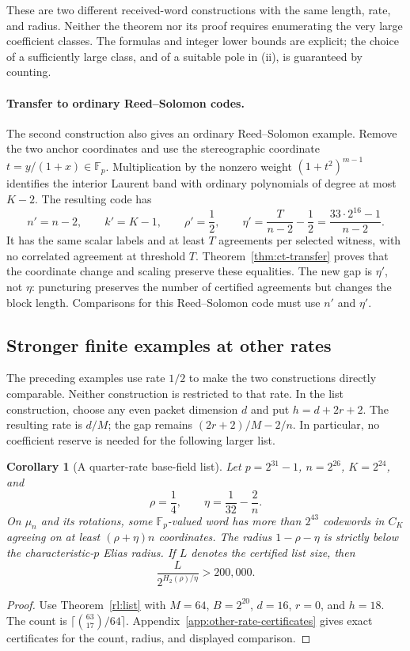 \documentclass[11pt,letterpaper]{article}
\newtheorem{corollary}[theorem]{Corollary}
\theoremstyle{definition}
\theoremstyle{remark}
\newcommand{\F}{\mathbb F}
\begin{document}
These are two different received-word constructions with the same
length, rate, and radius. Neither the theorem nor its proof requires
enumerating the very large coefficient classes. The formulas and
integer lower bounds are explicit; the choice of a sufficiently large
class, and of a suitable pole in (ii), is guaranteed by counting.

\paragraph{Transfer to ordinary Reed--Solomon codes.}
The second construction also gives an ordinary Reed--Solomon example.
Remove the two anchor coordinates and use the stereographic coordinate
$t=y/(1+x)\in\F_p$. Multiplication by the nonzero weight
$(1+t^2)^{m-1}$ identifies the interior Laurent band with ordinary
polynomials of degree at most $K-2$. The resulting code has
\[
 n'=n-2,\qquad k'=K-1,\qquad \rho'=\frac12,\qquad
 \eta'=\frac{T}{n-2}-\frac12
         =\frac{33\cdot2^{16}-1}{n-2}.
\]
It has the same scalar labels and at least $T$ agreements per
selected witness, with no correlated agreement at threshold $T$.
Theorem~\ref{thm:ct-transfer} proves that the coordinate change and
scaling preserve these equalities. The new gap is $\eta'$, not $\eta$:
puncturing preserves the number of certified agreements but changes
the block length. Comparisons for this Reed--Solomon code must use
$n'$ and $\eta'$.

\subsection{Stronger finite examples at other rates}

The preceding examples use rate $1/2$ to make the two constructions
directly comparable. Neither construction is restricted to that rate.
In the list construction, choose any even packet dimension $d$ and put
$h=d+2r+2$. The resulting rate is $d/M$; the gap remains
$(2r+2)/M-2/n$. In particular, no coefficient reserve is needed for
the following larger list.

\begin{corollary}[A quarter-rate base-field list]
\label{cor:quarter-list}
Let $p=2^{31}-1$, $n=2^{26}$, $K=2^{24}$, and
\[
 \rho=\frac14,\qquad \eta=\frac1{32}-\frac2n.
\]
On $\mu_n$ and its rotations, some $\F_p$-valued word has more than
$2^{43}$ codewords in $C_K$ agreeing on at least $(\rho+\eta)n$
coordinates. The radius $1-\rho-\eta$ is strictly below the
characteristic-$p$ Elias radius. If $L$ denotes the certified list size,
then
\[
 \frac{L}{2^{H_2(\rho)/\eta}}>200{,}000.
\]
\end{corollary}
\begin{proof}
Use Theorem~\ref{rl:list} with $M=64$, $B=2^{20}$, $d=16$, $r=0$,
and $h=18$. The count is $\lceil\binom{63}{17}/64\rceil$.
Appendix~\ref{app:other-rate-certificates} gives exact certificates
for the count, radius, and displayed comparison.
\end{proof}
\end{document}
